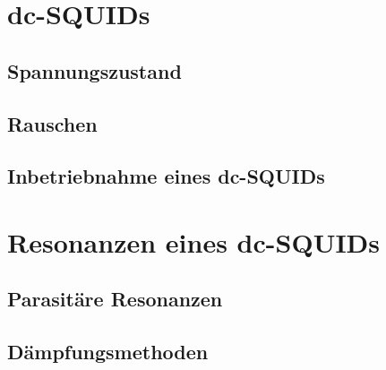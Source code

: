 \section{dc-SQUIDs}

\blindtext[3]

\subsection{Spannungszustand}

\subsection{Rauschen}

\subsection{Inbetriebnahme eines dc-SQUIDs}


\section{Resonanzen eines dc-SQUIDs}

\subsection{Parasitäre Resonanzen}

\subsection{Dämpfungsmethoden}


